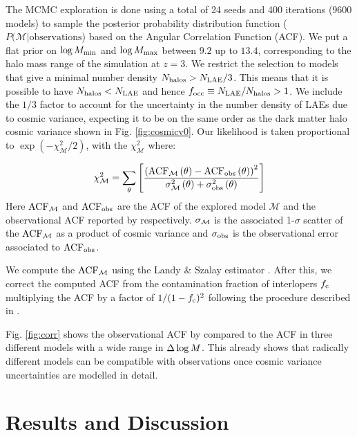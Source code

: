 \documentclass{emulateapj}
\newcommand{\mmax}{{\ifmmode{{M_{\rm max}}}\else{${M_{\rm max}}$}\fi}}
\newcommand{\dlm}{{\ifmmode{{\Delta \log M}}\else{$\Delta \log M$}\fi}}
\newcommand{\focc}{{\ifmmode{{f_{\rm occ}}}\else{${f_{\rm occ}}$}\fi}}
\begin{document}
The MCMC exploration is done using a total of 24 seeds and 400
iterations (9600 models) to sample the posterior  probability distribution function 
($P(\mathcal{M}|\mathrm{observations}$) based on the Angular
Correlation Function (ACF). We put a flat prior on $\log M_{\rm min}$ and $\log \mmax$ between
$9.2$ up to $13.4$, corresponding to the halo mass range of
the simulation at $z=3$.
We restrict the selection to models that give a minimal number density
$N_{\rm{halos}}>N_{\rm LAE}/3$.
This means that it is possible to have $N_{\rm{halos}} < N_{\rm LAE}$
and hence $\focc\equiv N_{\rm{LAE}}/N_{\rm{halos}}>1$.
We include the $1/3$ factor to account for the uncertainty in the number
density of LAEs due to cosmic variance, expecting it to be on the
same order as the dark matter halo cosmic variance shown in
Fig. \ref{fig:cosmicv0}.   Our likelihood is taken proportional to
$ \exp(-\chi_{\mathcal  M}^2/2)$, with the $\chi_{\mathcal{M}}^2$ where:

\begin{equation}
\chi_{\mathcal M}^2=
\sum_{\theta}\left[\frac{\left( \rm{ACF}_{\mathcal
      M}\left(\theta\right) - \rm{ACF}_{\rm
      obs}\left(\theta\right)\right)^2}{ \sigma_{\rm \mathcal
      M}^{2}\left(\theta\right) + \sigma_{\rm
      obs}^{2}\left(\theta\right)}\right]
\end{equation}
%
Here  $\rm{ACF}_{\mathcal M}$ and  $\rm{ACF}_{\rm obs}$ are the ACF
of the explored model ${\mathcal M}$ and the observational ACF
reported by \citet{Bielby16} respectively.
$\sigma_{\rm \mathcal M}$ is the associated 1-$\sigma$ scatter  of the
$\rm{ACF}_{\mathcal M}$ as a product of cosmic variance and
$\sigma_{\rm obs}$ is the observational error associated to
$\rm{ACF}_{\rm obs}$.



We compute the $\rm{ACF}_{\mathcal M}$ using the Landy \&  Szalay
estimator  \citep{Landy1993}. After this,  we correct the computed ACF
from the contamination fraction of interlopers $f_{\rm c}$ multiplying the
ACF by a factor of $1/(1-f_{\rm c})^{2}$  following the  procedure described in
 \citet{Bielby16}.

Fig. \ref{fig:corr} shows the observational ACF by
\citet{Bielby16} compared to the ACF in three different models with a
wide range in $\dlm$.  
This already shows that radically different models can be compatible
with observations once cosmic variance uncertainties are modelled in
detail. 


\section{Results and Discussion}
\label{sec:results}
\end{document}
